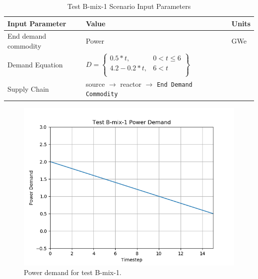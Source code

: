 \documentclass[11pt,letterpaper]{article}
\begin{document}
\begin{table}[H]
	\centering
	\caption{Test B-mix-1 Scenario Input Parameters }
	\label{tab:test_B-mix-1}
	\begin{tabular}{|l|l|l|}
		\hline
		\textbf{Input Parameter} & \textbf{Value} & \textbf{Units} \\
		\hline
		End demand commodity & Power & GWe \\
		Demand Equation & $D = \left\{
		\begin{array}{ll}
		0.5 * t , & 0 < t \leq 6 \\
		4.2 - 0.2 *t, &  6 < t  \\
		\end{array}\right\}$ & \\
		Supply Chain & source $\rightarrow$ reactor $\rightarrow$ \texttt{End Demand Commodity} &  \\
		\hline
	\end{tabular}
\end{table}

\begin{figure}[H]
	\begin{center}
		\includegraphics[scale=0.7]{./images/B-mix-1.png}
	\end{center}
	\caption{Power demand for test B-mix-1.}
	\label{fig:B-mix-1}
\end{figure}
\end{document}
